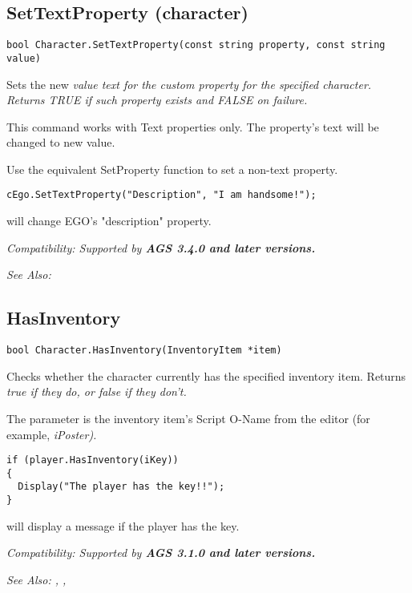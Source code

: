 \subsection{SetTextProperty (character)}\label{Character.SetTextProperty}%

\begin{verbatim}
bool Character.SetTextProperty(const string property, const string value)
\end{verbatim}
Sets the new \it{value} text for the custom \it{property} for the specified character. Returns
TRUE if such property exists and FALSE on failure.

This command works with Text properties only. The property's text will be
changed to new value.

Use the equivalent SetProperty function to set a non-text property.

\begin{verbatim}
cEgo.SetTextProperty("Description", "I am handsome!");
\end{verbatim}
will change EGO's "description" property.

\it{Compatibility:} Supported by \bf{AGS 3.4.0} and later versions.

\it{See Also:} 


\subsection{HasInventory}\label{Character.HasInventory}%

\begin{verbatim}
bool Character.HasInventory(InventoryItem *item)
\end{verbatim}
Checks whether the character currently has the specified inventory item.
Returns \it{true} if they do, or \it{false} if they don't.

The parameter is the inventory item's Script O-Name from the editor (for
example, \it{iPoster}).

\begin{verbatim}
if (player.HasInventory(iKey))
{
  Display("The player has the key!!");
}
\end{verbatim}
will display a message if the player has the key.

\it{Compatibility:} Supported by \bf{AGS 3.1.0} and later versions.

\it{See Also:} ,
,



